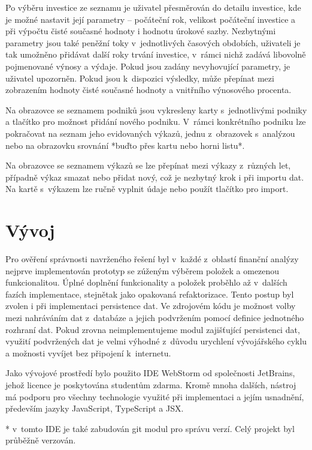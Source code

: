 Po výběru investice ze seznamu je uživatel přesměrován do detailu investice, kde je možné nastavit její parametry -- počáteční rok, velikost počáteční investice a při výpočtu čisté současné hodnoty i hodnotu úrokové sazby. Nezbytnými parametry jsou také peněžní toky v~jednotlivých časových obdobích, uživateli je tak umožněno přidávat další roky trvání investice, v~rámci nichž zadává libovolně pojmenované výnosy a výdaje. Pokud jsou zadány nevyhovující parametry, je uživatel upozorněn. Pokud jsou k~dispozici výsledky, může přepínat mezi zobrazením hodnoty čisté současné hodnoty a vnitřního výnosového procenta.

Na obrazovce se seznamem podniků jsou vykresleny karty s~jednotlivými podniky a tlačítko pro možnost přidání nového podniku. V~rámci konkrétního podniku lze pokračovat na seznam jeho evidovaných výkazů, jednu z~obrazovek s~analýzou nebo na obrazovku srovnání *buďto přes kartu nebo horni listu*. 

Na obrazovce se seznamem výkazů se lze přepínat mezi výkazy z~různých let, případně výkaz smazat nebo přidat nový, což je nezbytný krok i při importu dat. Na kartě s~výkazem lze ručně vyplnit údaje nebo použít tlačítko pro import.


\section{Vývoj}
Pro ověření správnosti navrženého řešení byl v~každé z~oblastí finanční analýzy nejprve implementován prototyp se zúženým výběrem položek a omezenou funkcionalitou. Úplné doplnění funkcionality a položek proběhlo až v~dalších fazích implementace, stejnětak jako opakovaná refaktorizace. Tento postup byl zvolen i při implementaci persistence dat. Ve zdrojovém kódu je možnost volby mezi nahráváním dat z~databáze a jejich podvržením pomocí definice jednotného rozhraní dat. Pokud zrovna neimplementujeme modul zajišťující persistenci dat, využití podvržených dat je velmi výhodné z~důvodu urychlení vývojářského cyklu a možnosti vyvíjet bez připojení k~internetu.

Jako vývojové prostředí bylo použito IDE WebStorm od společnosti JetBrains, jehož licence je poskytována studentům zdarma. Kromě mnoha dalších, nástroj má podporu pro všechny technologie využité při implementaci a jejím usnadnění, především jazyky JavaScript, TypeScript a JSX.

* v~tomto IDE je také zabudován git modul pro správu verzí. Celý projekt byl průběžně verzován.

